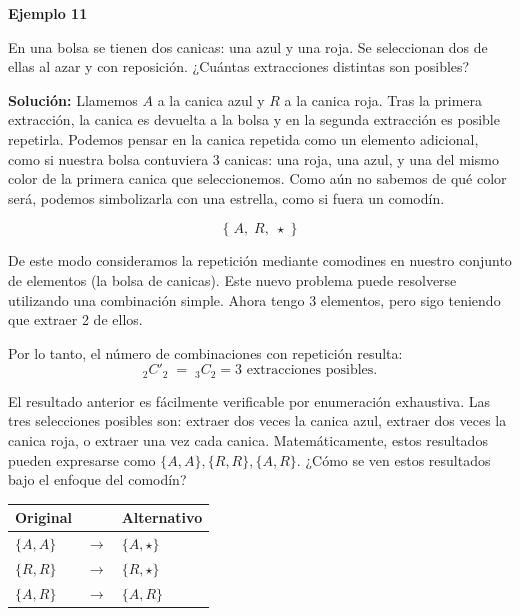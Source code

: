 \documentclass[
  letterpaper,
  DIV=11,
  numbers=noendperiod]{scrreprt}
\begin{document}
\begin{examplebox}

\begin{center}
\textbf{Ejemplo 11}

\end{center}

En una bolsa se tienen dos canicas: una azul y una roja. Se seleccionan
dos de ellas al azar y con reposición. ¿Cuántas extracciones distintas
son posibles?

\textbf{Solución:} Llamemos \(A\) a la canica azul y \(R\) a la canica
roja. Tras la primera extracción, la canica es devuelta a la bolsa y en
la segunda extracción es posible repetirla. Podemos pensar en la canica
repetida como un elemento adicional, como si nuestra bolsa contuviera 3
canicas: una roja, una azul, y una del mismo color de la primera canica
que seleccionemos. Como aún no sabemos de qué color será, podemos
simbolizarla con una estrella, como si fuera un comodín.

\[\{ \; A, \; R, \; \star \; \}\]

De este modo consideramos la repetición mediante comodines en nuestro
conjunto de elementos (la bolsa de canicas). Este nuevo problema puede
resolverse utilizando una combinación simple. Ahora tengo 3 elementos,
pero sigo teniendo que extraer 2 de ellos.

Por lo tanto, el número de combinaciones con repetición resulta:
\[_2C'_2 \;=\; _3C_2 = 3 \text{ extracciones posibles.}\]

\end{examplebox}

El resultado anterior es fácilmente verificable por enumeración
exhaustiva. Las tres selecciones posibles son: extraer dos veces la
canica azul, extraer dos veces la canica roja, o extraer una vez cada
canica. Matemáticamente, estos resultados pueden expresarse como
\(\{A, A\}, \{R, R\}, \{A, R\}\). ¿Cómo se ven estos resultados bajo el
enfoque del comodín?

\begin{flexcenter}

\begin{half}

\begin{longtable}[]{@{}lll@{}}
\toprule\noalign{}
Original & & Alternativo \\
\midrule\noalign{}
\endhead
\bottomrule\noalign{}
\endlastfoot
\(\{A,A\}\) & \(\longrightarrow\) & \(\{A,\star\}\) \\
\(\{R,R\}\) & \(\longrightarrow\) & \(\{R,\star\}\) \\
\(\{A,R\}\) & \(\longrightarrow\) & \(\{A,R\}\) \\
\end{longtable}

\end{half}

\end{flexcenter}
\end{document}
